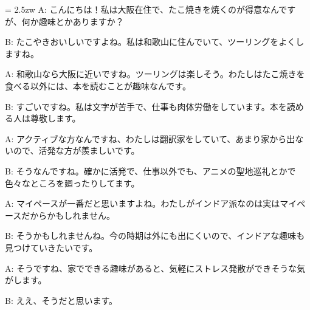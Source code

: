 \documentclass[11pt]{amsart}
\title{}
\author{}
\newenvironment{hangall}[1]{\hangindent = 2.5zw\everypar{\hangindent = 2.5zw}}{}
\begin{document}
\maketitle
\begin{hangall}{}%
A: こんにちは！私は大阪在住で、たこ焼きを焼くのが得意なんですが、何か趣味とかありますか？



B: たこやきおいしいですよね。私は和歌山に住んでいて、ツーリングをよくしますね。



A: 和歌山なら大阪に近いですね。ツーリングは楽しそう。わたしはたこ焼きを食べる以外には、本を読むことが趣味なんです。



B: すごいですね。私は文字が苦手で、仕事も肉体労働をしています。本を読める人は尊敬します。



A: アクティブな方なんですね、わたしは翻訳家をしていて、あまり家から出ないので、活発な方が羨ましいです。



B: そうなんですね。確かに活発で、仕事以外でも、アニメの聖地巡礼とかで色々なところを廻ったりしてます。



A: マイペースが一番だと思いますよね。わたしがインドア派なのは実はマイペースだからかもしれません。



B: そうかもしれませんね。今の時期は外にも出にくいので、インドアな趣味も見つけていきたいです。



A: そうですね、家でできる趣味があると、気軽にストレス発散ができそうな気がします。



B: ええ、そうだと思います。\end{hangall}
\end{document}
